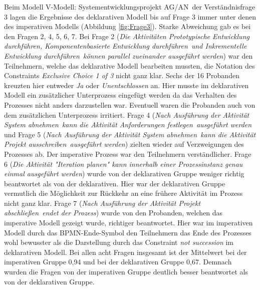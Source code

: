 Beim Modell \grqq V-Modell: Systementwicklungsprojekt AG/AN\grqq \ der Verständnisfrage 3 lagen die Ergebnisse des deklarativen Modell bis auf Frage 3 immer unter denen des imperativen Modells (Abbildung \ref{fig:Frage3}). Starke Abweichung gab es bei den Fragen 2, 4, 5, 6, 7. \newline
Bei Frage 2 (\textit{Die Aktivitäten \grqq Prototypische Entwicklung durchführen\grqq, \grqq Komponentenbasierte Entwicklung durchführen\grqq \ und \grqq Inkrementelle Entwicklung durchführen\grqq \ können parallel zueinander ausgeführt werden}) war den Teilnehmern, welche das deklarative Modell bearbeiten mussten, die Notation des Constraints \textit {Exclusive Choice 1 of 3} nicht ganz klar. Sechs der 16 Probanden kreuzten hier entweder \textit{Ja} oder \textit{Unentschlossen} an. Hier musste im deklarativen Modell ein zusätzlicher Unterprozess eingefügt werden da das Verhalten des Prozesses nicht anders darzustellen war. Eventuell waren die Probanden auch von dem zusätzlichen Unterprozess irritiert.\newline
Frage 4 (\textit{Nach Ausführung der Aktivität \grqq System abnehmen\grqq \ kann die Aktivität \grqq Anforderungen festlegen\grqq \ ausgeführt werden} und Frage 5 (\textit{Nach Ausführung der Aktivität \grqq System abnehmen\grqq \ kann die Aktivität \grqq Projekt ausschreiben\grqq \ ausgeführt werden}) zielten wieder auf Verzweigungen des Prozesses ab. Der imperative Prozess war den Teilnehmern verständlicher. \newline
Frage 6 (\textit{Die Aktivität "Iteration planen" kann innerhalb einer Prozessinstanz genau einmal ausgeführt werden}) wurde von der deklarativen Gruppe weniger richtig beantwortet als von der deklarativen. Hier war der deklarativen Gruppe vermutlich die Möglichkeit zur Rückkehr an eine frühere Aktivität im Prozess nicht ganz klar. \newline
Frage 7 (\textit{Nach Ausführung der Aktivität \grqq Projekt abschließen\grqq \ endet der Prozess}) wurde von den Probanden, welchen das imperative Modell gezeigt wurde, richtiger beantwortet. Hier war im imperativen Modell durch das BPMN-Ende-Symbol den Teilnehmern das Ende des Prozesses wohl bewusster als die Darstellung durch das Constraint \textit{not succession} im deklarativen Modell.\newline
Bei allen acht Fragen insgesamt ist der Mittelwert bei der imperativen Gruppe 0,94 und bei der deklarativen Gruppe 0,67. Demnach wurden die Fragen von der imperativen Gruppe deutlich besser beantwortet als von der deklarativen Gruppe. \newline


